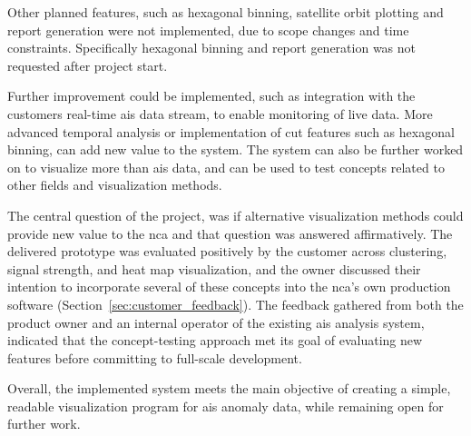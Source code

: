 Other planned features, such as hexagonal binning, satellite orbit plotting and report generation were not implemented, due to scope changes and time constraints. Specifically hexagonal binning and report generation was not requested after project start.

Further improvement could be implemented, such as integration with the customers real-time \acrshort{ais} data stream, to enable monitoring of live data. More advanced temporal analysis or implementation of cut features such as hexagonal binning, can add new value to the system. The system can also be further worked on to visualize more than \acrshort{ais} data, and can be used to test concepts related to other fields and visualization methods. 

The central question of the project, was if alternative visualization methods could provide new value to the \acrshort{nca} and that question was answered affirmatively. The delivered prototype was evaluated positively by the customer across clustering, signal strength, and heat map visualization, and the owner discussed their intention to incorporate several of these concepts into the \acrshort{nca}'s own production software (Section~\ref{sec:customer_feedback}). The feedback gathered from both the product owner and an internal operator of the existing \acrshort{ais} analysis system, indicated that the concept-testing approach met its goal of evaluating new features before committing to full-scale development.

Overall, the implemented system meets the main objective of creating a simple, readable visualization program for \acrshort{ais} anomaly data, while remaining open for further work. 



